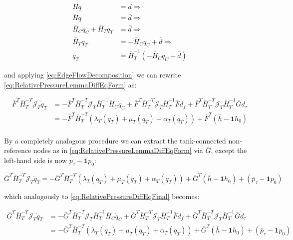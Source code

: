 \begin{equation}\label{eq:MassConservationPartitioned}
	\begin{split}
	H q &= d \Rightarrow \\  
	\bar{H}q &= \bar{d} \Rightarrow \\
	\bar{H}_C q_C + \bar{H}_T q_T &= \bar{d} \Rightarrow \\
	\bar{H}_T q_T &= -\bar{H}_C q_C + \bar{d} \Rightarrow	\\
	q_T &= \bar{H}_T^{-1}(-\bar{H}_C q_C + \bar{d})
	\end{split}
\end{equation}

and applying \cref{eq:EdgeFlowDecomposition} we can rewrite \cref{eq:RelativePressureLemmaDiffEqForm} as:

\begin{equation}\label{eq:RelativePressureDiffEqFinal}
	\begin{split}
	\bar{F}^T\bar{H}_T^{-T}\mathcal{J}_T\dot{q}_T &= 
	-\bar{F}^T\bar{H}_T^{-T}\mathcal{J}_T\bar{H}_T^{-1}\bar{H}_C\dot{q}_C + \bar{F}^T\bar{H}_T^{-T}\mathcal{J}_T\bar{H}_T^{-1}\bar{F}\dot{d}_f + \bar{F}^T\bar{H}_T^{-T}\mathcal{J}_T\bar{H}_T^{-1}\bar{G}\dot{d}_{\tau} \\
	&= -\bar{F}^T\bar{H}_T^{-T}(\lambda_T(q_T)+\mu_T(q_T) + \alpha_T(q_T)) + 
	\bar{F}^T(\bar{h} - \mathbf{1}h_0) \\	
	\end{split}
\end{equation}

By a completely analogous procedure we can extract the tank-connected non-reference nodes as in \cref{eq:RelativePressureLemmaDiffEqForm} via $\bar{G}$, except the left-hand side is now $p_{\tau}-\mathbf{1}p_0$:

\begin{equation}\label{eq:RelativePressureLemmaDiffEqFormG}
	\bar{G}^T\bar{H}_T^{-T}\mathcal{J}_T\dot{q}_T = - 	\bar{G}^T\bar{H}_T^{-T}(\lambda_T(q_T)+\mu_T(q_T) + \alpha_T(q_T)) +
	\bar{G}^T(\bar{h} - \mathbf{1}h_0) +
	(\bar{p}_\tau - \mathbf{1}p_0)
\end{equation}

which analogously to \cref{eq:RelativePressureDiffEqFinal} becomes:

\begin{equation}\label{eq:RelativePressureDiffEqFinalG}
	\begin{split}
		\bar{G}^T\bar{H}_T^{-T}\mathcal{J}_T\dot{q}_T &= 
		-\bar{G}^T\bar{H}_T^{-T}\mathcal{J}_T\bar{H}_T^{-1}\bar{H}_C\dot{q}_C + \bar{G}^T\bar{H}_T^{-T}\mathcal{J}_T\bar{H}_T^{-1}\bar{F}\dot{d}_f + \bar{G}^T\bar{H}_T^{-T}\mathcal{J}_T\bar{H}_T^{-1}\bar{G}\dot{d}_{\tau} \\
		&= -\bar{G}^T\bar{H}_T^{-T}(\lambda_T(q_T)+\mu_T(q_T) + \alpha_T(q_T)) + 
		\bar{G}^T(\bar{h} - \mathbf{1}h_0) +
		(\bar{p}_\tau - \mathbf{1}p_0) \\	
	\end{split}
\end{equation}

